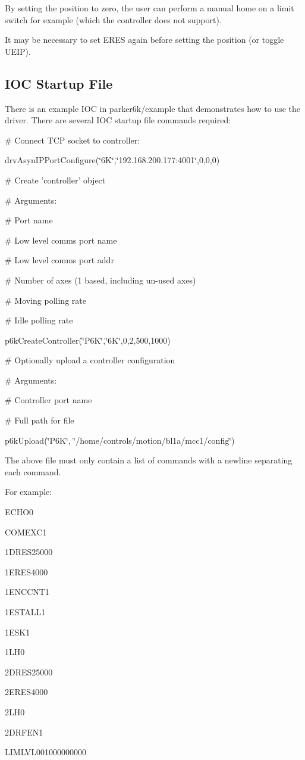 By setting the position to zero, the user can perform a manual home on a limit switch for example (which the controller does not support).

It may be necessary to set ERES again before setting the position (or toggle UEIP).\hypertarget{index_startup}{}\subsection{IOC Startup File}\label{index_startup}
There is an example IOC in parker6k/example that demonstrates how to use the driver. There are several IOC startup file commands required:

{\ttfamily  \# Connect TCP socket to controller:\par
 drvAsynIPPortConfigure(\char`\"{}6K\char`\"{},\char`\"{}192.168.200.177:4001\char`\"{},0,0,0)\par
}

{\ttfamily \# Create 'controller' object\par
 \# Arguments:\par
 \# Port name\par
 \# Low level comms port name\par
 \# Low level comms port addr\par
 \# Number of axes (1 based, including un-\/used axes)\par
 \# Moving polling rate\par
 \# Idle polling rate\par
 p6kCreateController(\char`\"{}P6K\char`\"{},\char`\"{}6K\char`\"{},0,2,500,1000)\par
}

{\ttfamily \# Optionally upload a controller configuration\par
 \# Arguments:\par
 \# Controller port name\par
 \# Full path for file\par
 p6kUpload(\char`\"{}P6K\char`\"{}, \char`\"{}/home/controls/motion/bl1a/mcc1/config\char`\"{})\par
 }

The above file must only contain a list of commands with a newline separating each command.

For example: {\ttfamily \par
 ECHO0\par
 COMEXC1\par
 1DRES25000\par
 1ERES4000\par
 1ENCCNT1\par
 1ESTALL1\par
 1ESK1\par
 1LH0\par
 2DRES25000\par
 2ERES4000\par
 2LH0\par
 2DRFEN1\par
 LIMLVL001000000000\par
 }

